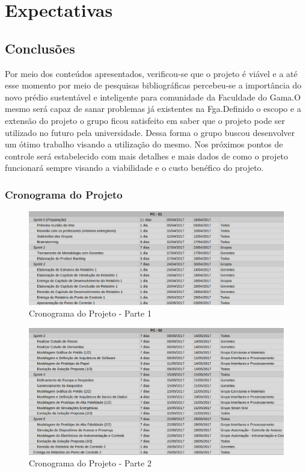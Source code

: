 \part{Expectativas}
\chapter[Conclusões]{Conclusões}

Por meio dos conteúdos apresentados, verificou-se que o projeto é viável e a até esse momento por meio de pesquisas bibliográficas percebeu-se a importância do novo prédio sustentável e inteligente para comunidade da Faculdade do Gama.O mesmo será capaz de sanar problemas já existentes na Fga.Definido o escopo e a extensão do projeto o grupo ficou satisfeito em saber que o projeto pode ser utilizado no futuro pela universidade. Dessa forma o grupo buscou desenvolver um ótimo trabalho visando a utilização do mesmo. Nos próximos pontos de controle será estabelecido com mais detalhes e mais dados de como o projeto funcionará sempre visando a viabilidade e o custo benéfico do projeto.
\section{Cronograma do Projeto}

\begin{figure}[!h]
 \centering	\includegraphics[keepaspectratio=true,scale=0.45]{figuras/c1.eps}
 \caption{Cronograma do Projeto - Parte 1}
 \label{fig022}
\end{figure}
\pagebreak
\begin{figure}[!h]
 \centering	\includegraphics[keepaspectratio=true,scale=0.45]{figuras/c2.eps}
 \caption{Cronograma do Projeto - Parte 2}
 \label{fig022}
\end{figure}


